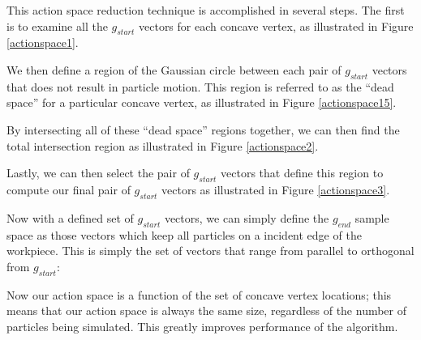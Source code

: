 This action space reduction technique is accomplished in several steps. The first is to examine all the $g_{start}$ vectors for each concave vertex, as illustrated in Figure \ref{actionspace1}.


We then define a region of the Gaussian circle between each pair of $g_{start}$ vectors that does not result in particle motion. This region is referred to as the ``dead space'' for a particular concave vertex, as illustrated in Figure \ref{actionspace15}.


By intersecting all of these ``dead space'' regions together, we can then find the total intersection region as illustrated in Figure \ref{actionspace2}.


Lastly, we can then select the pair of $g_{start}$ vectors that define this region to compute our final pair of $g_{start}$ vectors as illustrated in Figure \ref{actionspace3}.


Now with a defined set of $g_{start}$ vectors, we can simply define the $g_{end}$ sample space as those vectors which keep all particles on a incident edge of the workpiece. This is simply the set of vectors that range from parallel to orthogonal from $g_{start}$:


Now our action space is a function of the set of concave vertex locations; this means that our action space is always the same size, regardless of the number of particles being simulated. This greatly improves performance of the algorithm.

